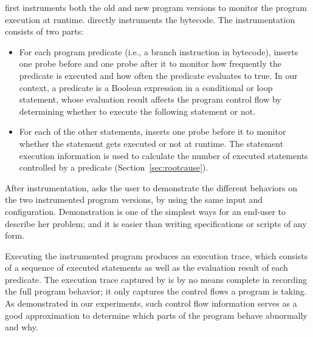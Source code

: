 \ourtool first instruments both the old and new program versions
to monitor the program  execution at runtime. \ourtool directly
instruments the bytecode. The instrumentation
consists of two parts:

\vspace{-2mm}

\begin{itemize}
\item For each program predicate (i.e., a branch instruction
in bytecode), \ourtool inserts one
probe before and one probe after it
to monitor how frequently the predicate is executed and
how often the predicate evaluates to true. In our
context, a predicate is a Boolean expression in a
conditional or loop statement,
whose evaluation result affects the program
control flow by determining whether to execute the
following statement or not.


\item For each of the other statements, \ourtool inserts
one probe before it to monitor whether the statement
gets executed or not at runtime. The statement execution
information is used to calculate the number of executed
statements controlled by a predicate (Section~\ref{sec:rootcause}).



\end{itemize}


\vspace{-1mm}

After instrumentation, \ourtool asks the user to demonstrate the different
behaviors on the two instrumented program versions, by using
the same input and configuration. Demonstration is
one of the simplest ways for an end-user to describe her problem;
and it is easier than writing specifications or scripts of any form.

Executing the instrumented program produces an execution trace,
which consists of a sequence of executed statements as well
as the evaluation result of each predicate.
The execution trace captured by \ourtool is by no means complete
in recording the full program behavior; it only
captures the control flows a program is taking. As demonstrated
in our experiments, such control flow information serves as a
good approximation to determine which parts of the program behave
abnormally and why.





